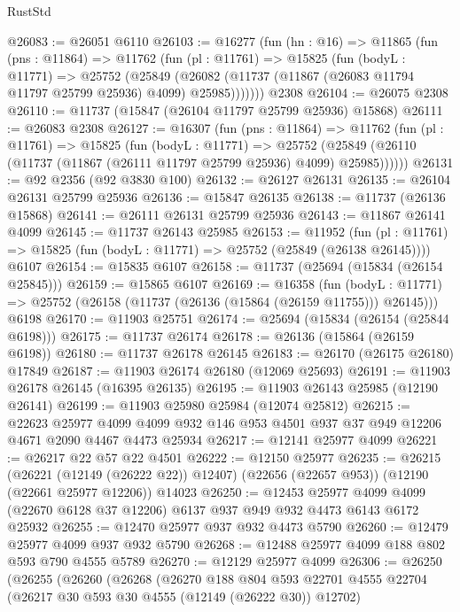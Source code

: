\begin{lexlean}{RustStd}
\begin{coremodule}
@26083 := @26051 @6110
@26103 := @16277
    (fun (hn : @16) =>
    @11865
      (fun (pns : @11864) =>
      @11762
        (fun (pl : @11761) =>
        @15825
          (fun (bodyL : @11771) =>
          @25752
            (@25849
              (@26082 (@11737 (@11867 (@26083 @11794 @11797 @25799 @25936) @4099) @25985)))))))
    @2308
@26104 := @26075 @2308
@26110 := @11737 (@15847 (@26104 @11797 @25799 @25936) @15868)
@26111 := @26083 @2308
@26127 := @16307
    (fun (pns : @11864) =>
    @11762
      (fun (pl : @11761) =>
      @15825
        (fun (bodyL : @11771) =>
        @25752 (@25849 (@26110 (@11737 (@11867 (@26111 @11797 @25799 @25936) @4099) @25985))))))
@26131 := @92 @2356 (@92 @3830 @100)
@26132 := @26127 @26131
@26135 := @26104 @26131 @25799 @25936
@26136 := @15847 @26135
@26138 := @11737 (@26136 @15868)
@26141 := @26111 @26131 @25799 @25936
@26143 := @11867 @26141 @4099
@26145 := @11737 @26143 @25985
@26153 := @11952
    (fun (pl : @11761) => @15825 (fun (bodyL : @11771) => @25752 (@25849 (@26138 @26145))))
    @6107
@26154 := @15835 @6107
@26158 := @11737 (@25694 (@15834 (@26154 @25845)))
@26159 := @15865 @6107
@26169 := @16358
    (fun (bodyL : @11771) => @25752 (@26158 (@11737 (@26136 (@15864 (@26159 @11755))) @26145)))
    @6198
@26170 := @11903 @25751
@26174 := @25694 (@15834 (@26154 (@25844 @6198)))
@26175 := @11737 @26174
@26178 := @26136 (@15864 (@26159 @6198))
@26180 := @11737 @26178 @26145
@26183 := @26170 (@26175 @26180) @17849
@26187 := @11903 @26174 @26180 (@12069 @25693)
@26191 := @11903 @26178 @26145 (@16395 @26135)
@26195 := @11903 @26143 @25985 (@12190 @26141)
@26199 := @11903 @25980 @25984 (@12074 @25812)
@26215 := @22623
    @25977
    @4099
    @4099
    @932
    @146
    @953
    @4501
    @937
    @37
    @949
    @12206
    @4671
    @2090
    @4467
    @4473
    @25934
@26217 := @12141 @25977 @4099
@26221 := @26217 @22 @57 @22 @4501
@26222 := @12150 @25977
@26235 := @26215
    (@26221 (@12149 (@26222 @22)) @12407)
    (@22656 (@22657 @953))
    (@12190 (@22661 @25977 @12206))
    @14023
@26250 := @12453
    @25977
    @4099
    @4099
    (@22670 @6128 @37 @12206)
    @6137
    @937
    @949
    @932
    @4473
    @6143
    @6172
    @25932
@26255 := @12470 @25977 @937 @932 @4473 @5790
@26260 := @12479 @25977 @4099 @937 @932 @5790
@26268 := @12488 @25977 @4099 @188 @802 @593 @790 @4555 @5789
@26270 := @12129 @25977 @4099
@26306 := @26250
    (@26255
      (@26260
        (@26268
          (@26270
            @188
            @804
            @593
            @22701
            @4555
            @22704
            (@26217 @30 @593 @30 @4555 (@12149 (@26222 @30)) @12702)

\end{coremodule}
\end{lexlean}
